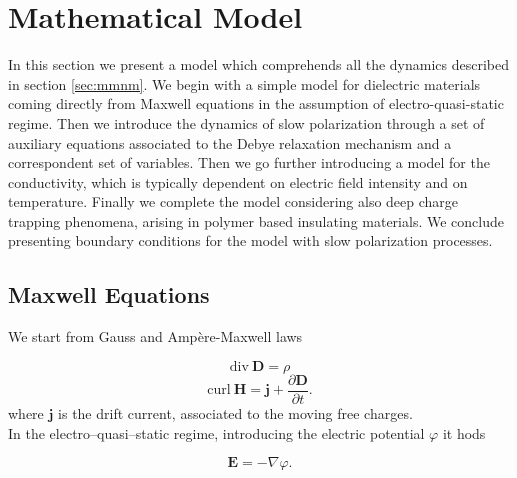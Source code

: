 \documentclass[11pt,a4paper]{article}
\begin{document}
\section{Mathematical Model}\label{sec:mat-model}
In this section we present a model which comprehends all the dynamics described in section \ref{sec:mmnm}. We begin with a simple model for dielectric materials coming directly from Maxwell equations in the assumption of electro-quasi-static regime. Then we introduce the dynamics of slow polarization through a set of auxiliary equations associated to the Debye relaxation mechanism and a correspondent set of variables. Then we go further introducing a model for the conductivity, which is typically dependent on electric field intensity and on temperature. Finally we complete the model considering also deep charge trapping phenomena, arising in polymer based insulating materials. We conclude presenting boundary conditions for the model with slow polarization processes.
\subsection{Maxwell Equations}
We start from Gauss and Ampère-Maxwell laws

\begin{equation}
	\mathrm{div}\  \mathbf{D}  = \rho 
	\label{eq:Maxwell1}
\end{equation}
\begin{equation}
	\mathrm{curl}\ \mathbf{H} = \mathbf{j} + \dfrac{\partial \mathbf{D}}{\partial t}.
	\label{eq:Maxwell2}
\end{equation}
where \(\mathbf{j}\) is the drift current, associated to the moving free charges.\\
In the electro--quasi--static regime, introducing the electric potential \(\varphi\) it hods

\begin{equation} 
	\mathbf{E} = - \nabla \varphi.
	\label{eq:Epotential}
\end{equation}
\end{document}
